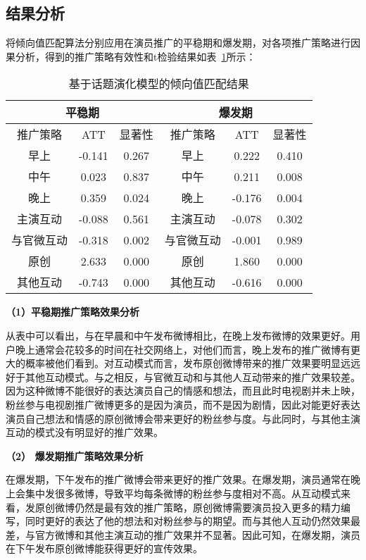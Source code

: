 \subsection{结果分析}

将倾向值匹配算法分别应用在演员推广的平稳期和爆发期，对各项推广策略进行因果分析，得到的推广策略有效性和t检验结果如表~\ref{res1}所示：

\begin{table}[!htbp]
\centering
\caption{基于话题演化模型的倾向值匹配结果}
\label{res1}
\begin{tabular}{|c|c|c|c|c|c|} \hline
\multicolumn{3}{|c|}{平稳期}& \multicolumn{3}{c|}{爆发期}\\ \hline
推广策略 & ATT & 显著性& 推广策略 & ATT & 显著性\\ \hline
早上 & -0.141 & 0.267& 早上 & 0.222 & 0.410\\%
中午 & 0.023 & 0.837 & 中午 & 0.211 & 0.008\\%
晚上 & 0.359 & 0.024 & 晚上 & -0.176 & 0.004\\ \hline
主演互动 & -0.088 & 0.561 &  主演互动 & -0.078 & 0.302\\
与官微互动& -0.318 & 0.002 & 与官微互动 & -0.001 & 0.989\\%
原创& 2.633 & 0.000 & 原创& 1.860 & 0.000\\
其他互动& -0.743 & 0.000 & 其他互动 & -0.616 & 0.000\\ \hline
\end{tabular}
\end{table}

\textbf{（1）平稳期推广策略效果分析}

从表中可以看出，与在早晨和中午发布微博相比，在晚上发布微博的效果更好。用户晚上通常会花较多的时间在社交网络上，对他们而言，晚上发布的推广微博有更大的概率被他们看到。对互动模式而言，发布原创微博带来的推广效果要明显远远好于其他互动模式。与之相反，与官微互动和与其他人互动带来的推广效果较差。因为这种微博不能很好的表达演员自己的情感和想法，而且此时电视剧并未上映，粉丝参与电视剧推广微博更多的是因为演员，而不是因为剧情，因此对能更好表达演员自己想法和情感的原创微博会带来更好的粉丝参与度。与此同时，与其他主演互动的模式没有明显好的推广效果。

\textbf{（2） 爆发期推广策略效果分析}

在爆发期，下午发布的推广微博会带来更好的推广效果。在爆发期，演员通常在晚上会集中发很多微博，导致平均每条微博的粉丝参与度相对不高。从互动模式来看，发原创微博仍然是最有效的推广策略，原创微博需要演员投入更多的精力编写，同时更好的表达了他的想法和对粉丝参与的期望。而与其他人互动仍然效果最差，与官方微博和其他主演互动的推广效果并不显著。因此可知，在爆发期，演员在下午发布原创微博能获得更好的宣传效果。

